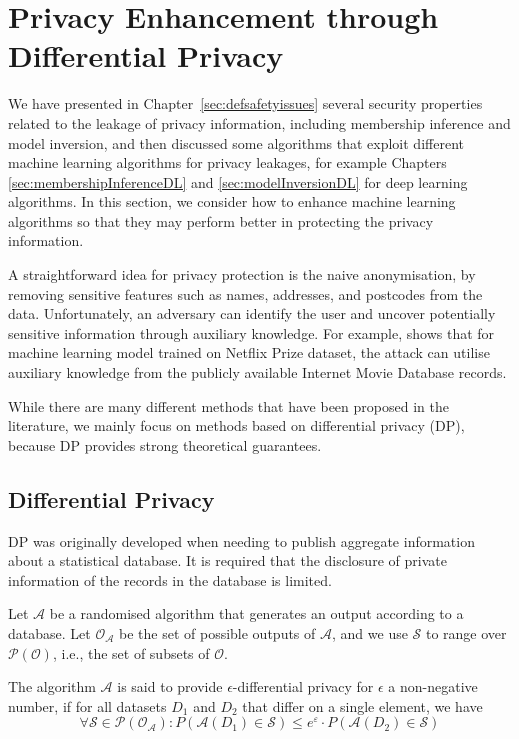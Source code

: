 \section{Privacy Enhancement through Differential Privacy}\label{sec:privacyenhancementsec}

We have presented in Chapter~\ref{sec:defsafetyissues} several security properties related to the leakage of privacy information, including membership inference and model inversion, and then discussed some algorithms that exploit different machine learning algorithms for privacy leakages, for example Chapters \ref{sec:membershipInferenceDL} and \ref{sec:modelInversionDL} for deep learning algorithms. In this section, we consider how to enhance machine learning algorithms so that they may perform better in protecting the privacy information.

A straightforward idea for privacy protection is the naive anonymisation, by removing sensitive features such as names, addresses, and postcodes from the data. Unfortunately, an adversary can identify the user and uncover potentially sensitive information through  auxiliary knowledge. For example, \cite{4531148} shows that for machine learning model trained on Netflix Prize dataset, the attack can utilise auxiliary knowledge from the publicly available Internet Movie Database records.  

While there are many different methods that have been proposed in the literature, we mainly focus on methods based on differential privacy (DP), because DP provides strong theoretical guarantees. 

\subsection{Differential Privacy}

DP was originally developed when needing to publish aggregate information about a statistical database. It is required that the disclosure of private information of the records in the database is limited. 

Let $\mathcal{A}$ be a randomised algorithm that generates an output according to a database. Let $\mathcal{O}_{\mathcal{A}}$ be the set of possible outputs of  $\mathcal{A}$, and we use $\mathcal{S}$ to range over $\mathcal{P}(\mathcal{O})$, i.e.,  the set of subsets of $\mathcal{O}$. 

\begin{definition}
The algorithm $\mathcal{A}$ is said to provide 
$\epsilon$-differential privacy for $\epsilon$ a non-negative number, if for all datasets $D_1$ and $D_2$ that differ on a single element, we have 
\begin{equation}
    \forall \mathcal{S}\in \mathcal{P}(\mathcal{O}_{\mathcal{A}}):  P(\mathcal{A}(D_1) \in \mathcal{S}) \leq e^{\varepsilon} \cdot P(\mathcal{A}(D_2) \in \mathcal{S})
\end{equation}
\end{definition}

